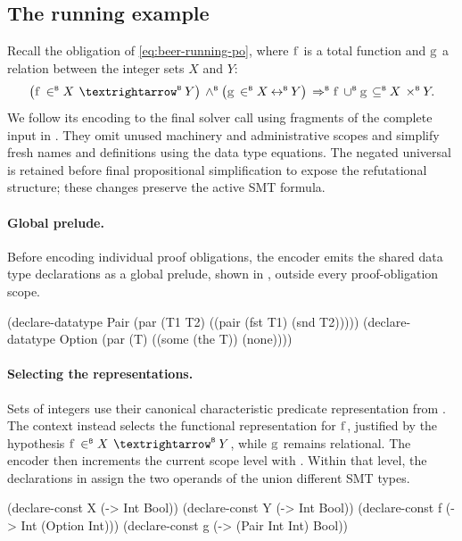\subsection{The running example}
\label{sec:beer-po-running-example}

Recall the obligation of \eqref{eq:beer-running-po}, where \(\var{f}\) is a total function and \(\var{g}\) a relation between the integer sets \(X\) and \(Y\):
\[
  \bigl(\var{f} \inB X \tfunB Y\bigr) \andB
  \bigl(\var{g} \inB X \mathbin{\bop{\leftrightarrow}} Y\bigr)
  \impB
  \var{f} \cupB \var{g} \subseteqB X \prodB Y.
\]
We follow its encoding to the final solver call using fragments of the complete input in .
They omit unused machinery and administrative scopes and simplify fresh names and definitions using the data type equations.
The negated universal is retained before final propositional simplification to expose the refutational structure; these changes preserve the active SMT formula.

\paragraph{Global prelude.}
Before encoding individual proof obligations, the encoder emits the shared data type declarations as a global prelude, shown in , outside every proof-obligation scope.

\begin{smtlisting}[title={Global data type prelude.}, label=lst:beer-running-prelude, float=h]
(declare-datatype Pair (par (T1 T2) ((pair (fst T1) (snd T2)))))
(declare-datatype Option (par (T) ((some (the T)) (none))))
\end{smtlisting}

\paragraph{Selecting the representations.}
Sets of integers use their canonical characteristic predicate representation from .
The context instead selects the functional representation for \(\var{f}\), justified by the hypothesis \(\var{f}\inB X\tfunB Y\), while \(\var{g}\) remains relational.
The encoder then increments the current scope level with .
Within that level, the declarations in  assign the two operands of the union different SMT types.

\begin{smtlisting}[title={Selected representations.}, label=lst:beer-running-declarations, float=h]
(declare-const X (-> Int Bool))
(declare-const Y (-> Int Bool))
(declare-const f (-> Int (Option Int)))
(declare-const g (-> (Pair Int Int) Bool))
\end{smtlisting}

